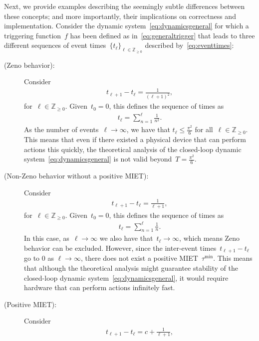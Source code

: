 \documentclass{autart}
\newcommand{\integernonnegative}{\mathbb{Z}_{\ge 0}}
\begin{document}
{  Next, we provide examples describing the seemingly subtle
  differences between these concepts; and more importantly, their
  implications on correctness and implementation. Consider the dynamic
  system~\eqref{eq:dynamicsgeneral} for which a triggering
  function~$f$ has been defined as in~\eqref{eq:generaltrigger} that
  leads to three different sequences of event times~$\{t_\ell\}_{\ell \in
    \integernonnegative}$ described by~\eqref{eq:eventtimes}:
\begin{description}
\item[(Zeno behavior):] Consider
  \begin{align*}
    t_{\ell+1}-t_\ell = \frac{1}{(\ell+1)^2},
  \end{align*}
  for~$\ell \in \integernonnegative$. Given~$t_0 = 0$, this defines
  the sequence of times as
  \begin{align*}
    t_\ell = \sum_{n=1}^\ell \frac{1}{n^2}.
  \end{align*}
  As the number of events~$\ell \rightarrow \infty$, we have that
  $t_\ell \leq \frac{\pi^2}{6}$ for all~$\ell \in
  \integernonnegative$. This means that even if there existed a
  physical device that can perform actions this quickly, the
  theoretical analysis of the closed-loop dynamic
  system~\eqref{eq:dynamicsgeneral} is not valid beyond~$T =
  \frac{\pi^2}{6}$.
\item[(Non-Zeno behavior without a positive MIET):] Consider
  \begin{align*}
    t_{\ell+1}-t_\ell = \frac{1}{\ell+1},
  \end{align*}
  for~$\ell \in \integernonnegative$. Given~$t_0 = 0$, this defines
  the sequence of times as
  \begin{align*}
    t_\ell = \sum_{n=1}^\ell \frac{1}{n}.
  \end{align*}
  In this case, as~$\ell \rightarrow \infty$ we also have that~$t_\ell
  \rightarrow \infty$, which means Zeno behavior can be
  excluded. However, since the inter-event times~$t_{\ell+1} -
  t_{\ell}$ go to 0 as $\ell \rightarrow \infty$, there does not exist
  a positive MIET~$\tau^\text{min}$. This means that although the
  theoretical analysis might guarantee stability of the closed-loop
  dynamic system~\eqref{eq:dynamicsgeneral}, it would require hardware
  that can perform actions infinitely fast.
\item[(Positive MIET):] Consider
  \begin{align*}
    t_{\ell+1} - t_\ell = c + \frac{1}{\ell+1},
  \end{align*}

\end{description}}
\end{document}
